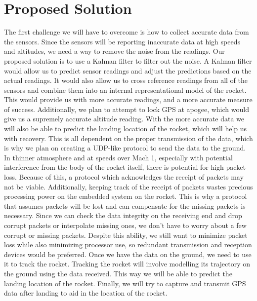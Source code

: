 \documentclass[onecolumn, draftclsnofoot,10pt, compsoc]{IEEEtran}
\begin{document}
\section{Proposed Solution}
The first challenge we will have to overcome is how to collect accurate data from the sensors.
Since the sensors will be reporting inaccurate data at high speeds and altitudes, we need a way to remove the noise from the readings.
Our proposed solution is to use a Kalman filter to filter out the noise.
A Kalman filter would allow us to predict sensor readings and adjust the predictions based on the actual readings.
It would also allow us to cross reference readings from all of the sensors and combine them into an internal representational model of the rocket.
This would provide us with more accurate readings, and a more accurate measure of success.
Additionally, we plan to attempt to lock GPS at apogee, which would give us a supremely accurate altitude reading.
With the more accurate data we will also be able to predict the landing location of the rocket, which will help us with recovery.
This is all dependent on the proper transmission of the data, which is why we plan on creating a UDP-like protocol to send the data to the ground.
In thinner atmosphere and at speeds over Mach 1, especially with potential interference from the body of the rocket itself, there is potential for high packet loss.
Because of this, a protocol which acknowledges the receipt of packets may not be viable.
Additionally, keeping track of the receipt of packets wastes precious processing power on the embedded system on the rocket.
This is why a protocol that assumes packets will be lost and can compensate for the missing packets is necessary.
Since we can check the data integrity on the receiving end and drop corrupt packets or interpolate missing ones, we don't have to worry about a few corrupt or missing packets.
Despite this ability, we still want to minimize packet loss while also minimizing processor use, so redundant transmission and reception devices would be preferred.
Once we have the data on the ground, we need to use it to track the rocket.
Tracking the rocket will involve modelling its trajectory on the ground using the data received.
This way we will be able to predict the landing location of the rocket.
Finally, we will try to capture and transmit GPS data after landing to aid in the location of the rocket.
\end{document}
